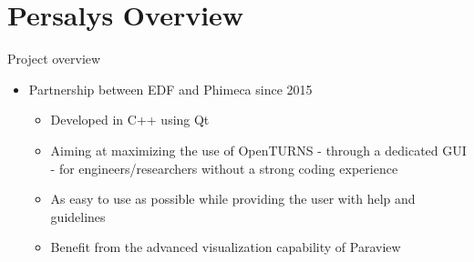 \documentclass{beamer}
\begin{document}
\section{Persalys Overview}
\begin{frame}{Project overview}
  \begin{itemize}
  \item
    Partnership between EDF and Phimeca since 2015
  
    \begin{itemize}
    \item
      Developed in C++ using Qt
    \item
      Aiming at maximizing the use of OpenTURNS - through a dedicated GUI
      - for engineers/researchers without a strong coding experience
    \item
      As easy to use as possible while providing the user with help and
      guidelines
    \item
      Benefit from the advanced visualization capability of
      Paraview
    \end{itemize}
  \end{itemize}
  \end{frame}
  
\end{document}
